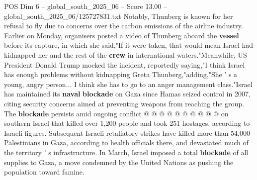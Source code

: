 \begin{textsample}{POS Dim 6 – global\_south\_2025\_06 – Score 13.00 – global\_south\_2025\_06/125727831.txt}
Notably, Thunberg is known for her refusal to fly due to concerns over the carbon emissions of the airline industry.
Earlier on Monday, organisers posted a video of Thunberg aboard the \textbf{vessel} before its capture, in which she said,"If it were taken, that would mean Israel had kidnapped her and the rest of the \textbf{crew} in international waters."Meanwhile, US President Donald Trump mocked the incident, reportedly saying,"I think Israel has enough problems without kidnapping Greta Thunberg,"adding,"She ' s a young, angry person...
I think she has to go to an anger management class."Israel has maintained its \textbf{naval} \textbf{blockade} on Gaza since Hamas seized control in 2007, citing security concerns aimed at preventing weapons from reaching the group.
The \textbf{blockade} persists amid ongoing conflict @ @ @ @ @ @ @ @ @ @ on southern Israel that killed over 1,200 people and took 251 hostages, according to Israeli figures.
Subsequent Israeli retaliatory strikes have killed more than 54,000 Palestinians in Gaza, according to health officials there, and devastated much of the territory ' s infrastructure.
In March, Israel imposed a total \textbf{blockade} of all supplies to Gaza, a move condemned by the United Nations as pushing the population toward famine.

\end{textsample}
